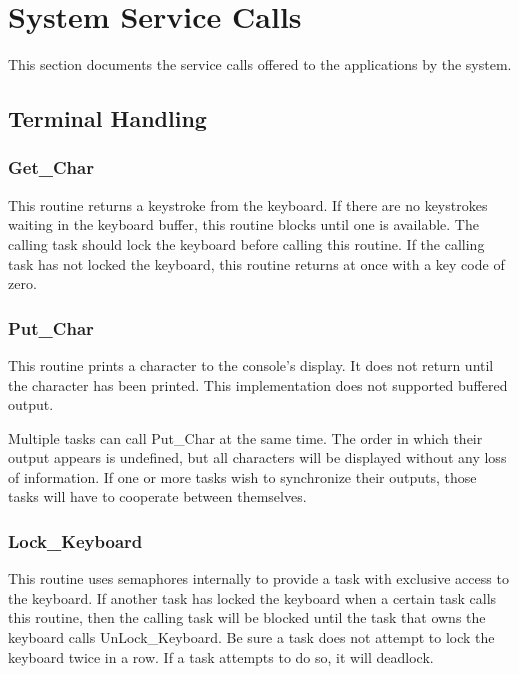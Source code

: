 \documentclass{article}
\begin{document}
\section{System Service Calls}

This section documents the service calls offered to the applications by the system.

\subsection{Terminal Handling}

\subsubsection{Get\_Char}

This routine returns a keystroke from the keyboard. If there are no keystrokes waiting in the
keyboard buffer, this routine blocks until one is available. The calling task should lock the
keyboard before calling this routine. If the calling task has not locked the keyboard, this
routine returns at once with a key code of zero.

\subsubsection{Put\_Char}

This routine prints a character to the console's display. It does not return until the character
has been printed. This implementation does not supported buffered output.

Multiple tasks can call Put\_Char at the same time. The order in which their output appears is
undefined, but all characters will be displayed without any loss of information. If one or more
tasks wish to synchronize their outputs, those tasks will have to cooperate between themselves.

\subsubsection{Lock\_Keyboard}

This routine uses semaphores internally to provide a task with exclusive access to the keyboard.
If another task has locked the keyboard when a certain task calls this routine, then the calling
task will be blocked until the task that owns the keyboard calls UnLock\_Keyboard. Be sure a
task does not attempt to lock the keyboard twice in a row. If a task attempts to do so, it will
deadlock.
\end{document}
